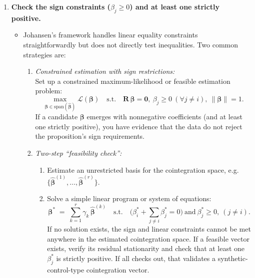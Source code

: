 \begin{enumerate}
    \item \textbf{Check the sign constraints ($\beta_j \ge 0$) and at least one strictly positive.}
    \begin{itemize}
        \item Johansen's framework handles linear equality constraints straightforwardly but does not directly test inequalities. Two common strategies are:
        \begin{enumerate}
            \item \textit{Constrained estimation with sign restrictions:}\\
            Set up a constrained maximum-likelihood or feasible estimation problem:
            $$
               \max_{\boldsymbol{\beta}\in \mathrm{span}(\widehat{\boldsymbol{\beta}})} \mathcal{L}(\boldsymbol{\beta})
               \quad \text{s.t.} \quad
               \mathbf{R}\,\boldsymbol{\beta} = \mathbf{0},\ 
               \beta_j \ge 0\ (\forall j\neq i),\ 
               \|\boldsymbol{\beta}\|=1.
            $$
            If a candidate $\boldsymbol{\beta}$ emerges with nonnegative coefficients (and at least one strictly positive), you have evidence that the data do not reject the proposition's sign requirements.
            \item \textit{Two-step ``feasibility check'':}\\
            \begin{enumerate}
                \item Estimate an unrestricted basis for the cointegration space, e.g.\ $\{\widehat{\boldsymbol{\beta}}^{(1)}, \dots, \widehat{\boldsymbol{\beta}}^{(r)}\}$. 
                \item Solve a simple linear program or system of equations:
                $$
                  \boldsymbol{\beta}^* \;=\; \sum_{k=1}^r \gamma_k\,\widehat{\boldsymbol{\beta}}^{(k)}
                  \quad\text{s.t.}\quad 
                  \bigl(\beta^*_i + \sum_{j \neq i}\beta^*_j = 0\bigr)
                  \ \text{and}\ 
                  \beta^*_j \ge 0,\ (j \neq i).
                $$
                If no solution exists, the sign and linear constraints cannot be met anywhere in the estimated cointegration space. If a feasible vector exists, verify its residual stationarity and check that at least one $\beta^*_j$ is strictly positive. If all checks out, that validates a synthetic-control-type cointegration vector.
            \end{enumerate}
        \end{enumerate}
    \end{itemize}


\end{enumerate}
